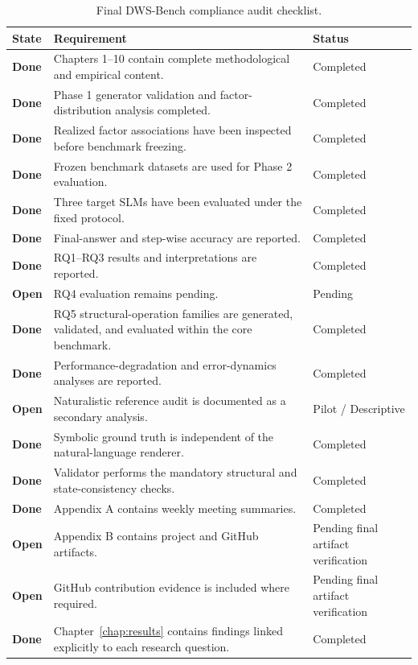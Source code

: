 \documentclass{iutbscthesis}
\begin{document}
\begin{appendices}
\begin{table}[H]
\centering
\small
\renewcommand{\arraystretch}{1.4}
\begin{tabular}{|p{}|p{}|p{}|}
\hline
\textbf{State} & \textbf{Requirement} & \textbf{Status} \\
\hline
\textbf{Done} & Chapters 1--10 contain complete methodological and empirical content. & Completed \\
\hline
\textbf{Done} & Phase 1 generator validation and factor-distribution analysis completed. & Completed \\
\hline
\textbf{Done} & Realized factor associations have been inspected before benchmark freezing. & Completed \\
\hline
\textbf{Done} & Frozen benchmark datasets are used for Phase 2 evaluation. & Completed \\
\hline
\textbf{Done} & Three target SLMs have been evaluated under the fixed protocol. & Completed \\
\hline
\textbf{Done} & Final-answer and step-wise accuracy are reported. & Completed \\
\hline
\textbf{Done} & RQ1--RQ3 results and interpretations are reported. & Completed \\
\hline
\textbf{Open} & RQ4 evaluation remains pending. & Pending \\
\hline
\textbf{Done} & RQ5 structural-operation families are generated, validated, and evaluated within the core benchmark. & Completed \\
\hline
\textbf{Done} & Performance-degradation and error-dynamics analyses are reported. & Completed \\
\hline
\textbf{Open} & Naturalistic reference audit is documented as a secondary analysis. & Pilot / Descriptive \\
\hline
\textbf{Done} & Symbolic ground truth is independent of the natural-language renderer. & Completed \\
\hline
\textbf{Done} & Validator performs the mandatory structural and state-consistency checks. & Completed \\
\hline
\textbf{Done} & Appendix A contains weekly meeting summaries. & Completed \\
\hline
\textbf{Open} & Appendix B contains project and GitHub artifacts. & Pending final artifact verification \\
\hline
\textbf{Open} & GitHub contribution evidence is included where required. & Pending final artifact verification \\
\hline
\textbf{Done} & Chapter~\ref{chap:results} contains findings linked explicitly to each research question. & Completed \\
\hline
\end{tabular}
\caption{Final DWS-Bench compliance audit checklist.}
\label{tab:final-audit}
\end{table}


\end{appendices}
\end{document}
